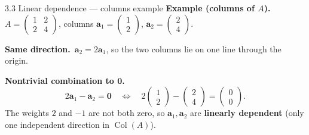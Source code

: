 \documentclass[11pt,aspectratio=169]{beamer}
\begin{document}
\begin{frame}{3.3 Linear dependence --- columns example}
  \footnotesize
  \textbf{Example (columns of $A$).}\
  $A=\begin{pmatrix}1&2\\ 2&4\end{pmatrix}$, columns
  $\mathbf{a}_1=\begin{pmatrix}1\\ 2\end{pmatrix}$,
  $\mathbf{a}_2=\begin{pmatrix}2\\ 4\end{pmatrix}$.

  \medskip
  \textbf{Same direction.}\
  $\mathbf{a}_2=2\mathbf{a}_1$, so the two columns lie on one line through the origin.

  \medskip
  \textbf{Nontrivial combination to $\mathbf{0}$.}\
  \[
    2\mathbf{a}_1-\mathbf{a}_2=\mathbf{0}
    \quad\Longleftrightarrow\quad
    2\begin{pmatrix}1\\ 2\end{pmatrix}-\begin{pmatrix}2\\ 4\end{pmatrix}
    =\begin{pmatrix}0\\ 0\end{pmatrix}.
  \]
  The weights $2$ and $-1$ are not both zero, so $\mathbf{a}_1,\mathbf{a}_2$ are
  \textbf{linearly dependent} (only one independent direction in $\operatorname{Col}(A)$).
\end{frame}
\end{document}
